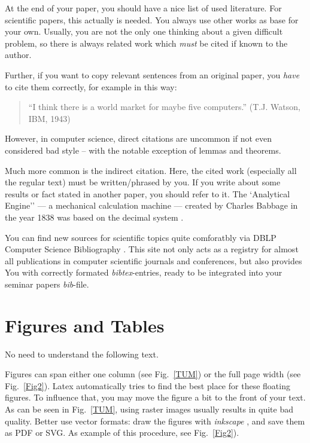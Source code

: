 \documentclass[twocolumn]{article}
\begin{document}
At the end of your paper, you should have a nice list of used
literature. For scientific papers, this actually is needed. You always
use other works as base for your own. Usually, you are not the only
one thinking about a given difficult problem, so there is always
related work which {\em must} be cited if known to the author.

Further, if you want to copy relevant sentences from an
original paper, you {\em have} to cite them correctly, for example
in this way:
\begin{quote}
	``I think there is a world market for maybe five computers.''
	(T.J. Watson, IBM, 1943)
\end{quote}
However, in computer science, direct citations are uncommon if not
even considered bad style -- with the notable exception of lemmas
and theorems.

Much more common is the indirect citation. Here, the cited work
(especially all the regular text) must be
written/phrased by you. If you write about some results or fact
stated in another paper, you should refer to it.
The `Analytical Engine'' --- a mechanical calculation machine ---
created by Charles Babbage in the year 1838 was based on the decimal
system
\cite{Brom98}.

You can find new sources for scientific topics quite comforatbly via
DBLP Computer Science Bibliography \cite{DBLP}. This site not only
acts as a registry for almost all publications in computer scientific
journals and conferences, but also provides You with correctly
formated \emph{bibtex}-entries, ready to be integrated into your
seminar papers \emph{bib}-file.

\section{Figures and Tables}

No need to understand the following text.

Figures can span either one column (see Fig.~\ref{TUM}) or the full
page width (see Fig.~\ref{Fig2}).
Latex automatically tries to find the best place for these floating
figures. To influence that, you may move the figure a bit to the front
of your text.
As can be seen in Fig.~\ref{TUM}, using raster images usually results in
quite bad quality. Better use vector formats: draw the figures with
{\em inkscape} \cite{inkscape}, and save them as PDF or SVG. As example of
this procedure, see Fig.~\ref{Fig2}).
\end{document}
